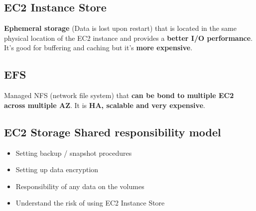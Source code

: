 \subsection{EC2 Instance Store}\label{subsec:ec2-instance-store}
\textbf{Ephemeral storage} (Data is lost upon restart) that is located in the same physical location of the EC2 instance and provides a \textbf{better I/O performance}. It's good for buffering and caching but it's \textbf{more expensive}.

\subsection{EFS}\label{subsec:efs}
Managed NFS (network file system) that \textbf{can be bond to multiple EC2 across multiple AZ}. It is \textbf{HA, scalable and very expensive}.

\subsection{EC2 Storage Shared responsibility model}\label{subsec:ec2-storage-shared-responsibility-model}
\begin{itemize}
	\item{Setting backup / snapshot procedures}
	\item{Setting up data encryption}
	\item{Responsibility of any data on the volumes}
	\item{Understand the risk of using EC2 Instance Store}
\end{itemize}